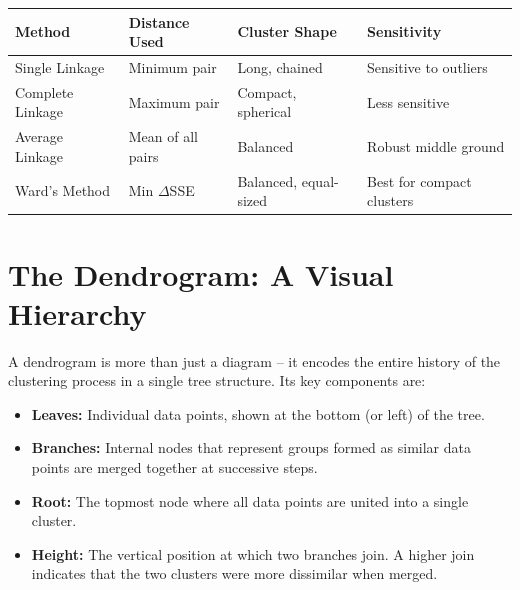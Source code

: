 \documentclass{article}
\begin{document}
\begin{center}
\begin{tabular}{|l|l|l|l|}
\hline
\textbf{Method} & \textbf{Distance Used} & \textbf{Cluster Shape} & \textbf{Sensitivity} \\
\hline
Single Linkage  & Minimum pair & Long, chained & Sensitive to outliers \\
Complete Linkage & Maximum pair & Compact, spherical & Less sensitive \\
Average Linkage  & Mean of all pairs & Balanced & Robust middle ground \\
Ward's Method    & Min $\Delta$SSE & Balanced, equal-sized & Best for compact clusters \\
\hline
\end{tabular}
\end{center}

\section{The Dendrogram: A Visual Hierarchy}

A dendrogram is more than just a diagram -- it encodes the entire history of the clustering process in a single tree structure. Its key components are:

\begin{itemize}
    \item \textbf{Leaves:} Individual data points, shown at the bottom (or left) of the tree.
    \item \textbf{Branches:} Internal nodes that represent groups formed as similar data points are merged together at successive steps.
    \item \textbf{Root:} The topmost node where all data points are united into a single cluster.
    \item \textbf{Height:} The vertical position at which two branches join. A higher join indicates that the two clusters were more dissimilar when merged.
\end{itemize}
\end{document}
